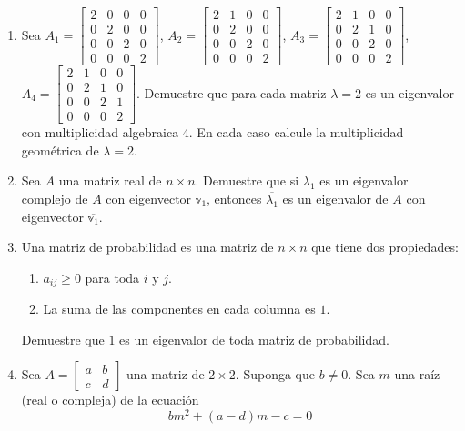 \begin{enumerate}[resume]
    \item Sea $A_{1}=\begin{bmatrix*}2 & 0 & 0 & 0 \\ 0 & 2 & 0 & 0 \\ 0 & 0 & 2 & 0 \\ 0 & 0 & 0 & 2\end{bmatrix*}$, $A_{2}=\begin{bmatrix*}2 & 1 & 0 & 0 \\ 0 & 2 & 0 & 0 \\ 0 & 0 & 2 & 0 \\ 0 & 0 & 0 & 2\end{bmatrix*}$, $A_{3}=\begin{bmatrix*}2 & 1 & 0 & 0 \\ 0 & 2 & 1 & 0 \\ 0 & 0 & 2 & 0 \\ 0 & 0 & 0 & 2\end{bmatrix*}$, $A_{4}=\begin{bmatrix*}2 & 1 & 0 & 0 \\ 0 & 2 & 1 & 0 \\ 0 & 0 & 2 & 1 \\ 0 & 0 & 0 & 2\end{bmatrix*}$.
    Demuestre que para cada matriz $\lambda=2$ es un eigenvalor con multiplicidad algebraica $4$. En cada caso calcule la multiplicidad geométrica de $\lambda=2$.
    \item Sea $A$ una matriz real de $n \times n$. Demuestre que si $\lambda_{1}$ es un eigenvalor complejo de $A$ con eigenvector $\mathbb{v}_{1}$, entonces $\overline{\lambda_{1}}$ es un eigenvalor de $A$ con eigenvector $\overline{\mathbb{v}_{1}}$.
    \item Una matriz de probabilidad es una matriz de $n \times n$ que tiene dos propiedades:
    \begin{enumerate}
        \item $a_{i j} \geq 0$ para toda $i$ y $j$.
        \item La suma de las componentes en cada columna es $1$.
    \end{enumerate}
    Demuestre que $1$ es un eigenvalor de toda matriz de probabilidad.
    \item Sea $A=\begin{bmatrix*}a & b \\ c & d\end{bmatrix*}$ una matriz de $2 \times 2$. Suponga que $b \neq 0$. Sea $m$ una raíz (real o compleja) de la ecuación
    $$b m^{2}+(a-d) m-c=0$$

\end{enumerate}
